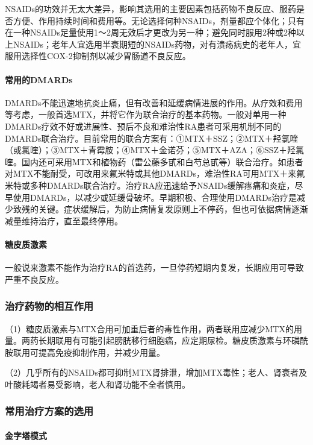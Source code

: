 NSAIDs的功效并无太大差异，影响其选用的主要因素包括药物不良反应、服药是否方便、作用持续时间和费用等。无论选择何种NSAIDs，剂量都应个体化；只有在一种NSAIDs足量使用1～2周无效后才更改为另一种；避免同时服用2种或2种以上NSAIDs；老年人宜选用半衰期短的NSAIDs药物，对有溃疡病史的老年人，宜服用选择性COX-2抑制剂以减少胃肠道不良反应。
\paragraph{常用的DMARDs}

DMARDs不能迅速地抗炎止痛，但有改善和延缓病情进展的作用。从疗效和费用等考虑，一般首选MTX，并将它作为联合治疗的基本药物。一般对单用一种DMARDs疗效不好或进展性、预后不良和难治性RA患者可采用机制不同的DMARDs联合治疗。目前常用的联合方案有：①MTX＋SSZ；②MTX＋羟氯喹（或氯喹）；③MTX＋青霉胺；④MTX＋金诺芬；⑤MTX＋AZA；⑥SSZ＋羟氯喹。国内还可采用MTX和植物药（雷公藤多甙和白芍总甙等）联合治疗。如患者对MTX不能耐受，可改用来氟米特或其他DMARDs，难治性RA可用MTX＋来氟米特或多种DMARDs联合治疗。治疗RA应迅速给予NSAIDs缓解疼痛和炎症，尽早使用DMARDs，以减少或延缓骨破坏。早期积极、合理使用DMARDs治疗是减少致残的关键。症状缓解后，为防止病情复发原则上不停药，但也可依据病情逐渐减量维持治疗，直至最终停用。
\paragraph{糖皮质激素}

一般说来激素不能作为治疗RA的首选药，一旦停药短期内复发，长期应用可导致严重不良反应。

\subsubsection{治疗药物的相互作用}

（1）糖皮质激素与MTX合用可加重后者的毒性作用，两者联用应减少MTX的用量。两药长期联用有可能引起膀胱移行细胞癌，应定期尿检。糖皮质激素与环磷酰胺联用可提高免疫抑制作用，并减少用量。

（2）几乎所有的NSAIDs都可抑制MTX肾排泄，增加MTX毒性；老人、肾衰者及叶酸耗竭者易受影响，老人和肾功能不全者慎用。

\subsubsection{常用治疗方案的选用}
\paragraph{金字塔模式}

